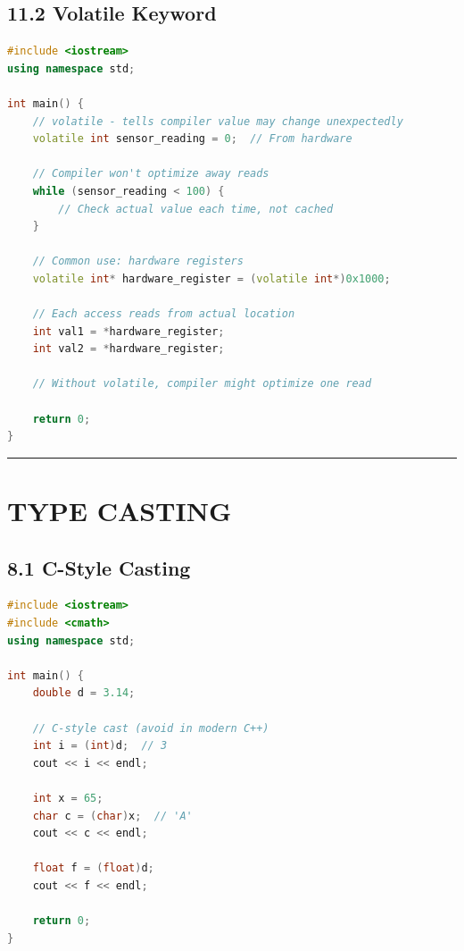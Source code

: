 \hypertarget{volatile-keyword}{%
\section{11.2 Volatile Keyword}\label{volatile-keyword}}

\begin{lstlisting}[language={C++}]
#include <iostream>
using namespace std;

int main() {
    // volatile - tells compiler value may change unexpectedly
    volatile int sensor_reading = 0;  // From hardware
    
    // Compiler won't optimize away reads
    while (sensor_reading < 100) {
        // Check actual value each time, not cached
    }
    
    // Common use: hardware registers
    volatile int* hardware_register = (volatile int*)0x1000;
    
    // Each access reads from actual location
    int val1 = *hardware_register;
    int val2 = *hardware_register;
    
    // Without volatile, compiler might optimize one read
    
    return 0;
}
\end{lstlisting}

\begin{center}\rule{0.5\linewidth}{0.5pt}\end{center}

\hypertarget{type-casting}{%
\chapter{TYPE CASTING}\label{type-casting}}

\hypertarget{c-style-casting}{%
\section{8.1 C-Style Casting}\label{c-style-casting}}

\begin{lstlisting}[language={C++}]
#include <iostream>
#include <cmath>
using namespace std;

int main() {
    double d = 3.14;
    
    // C-style cast (avoid in modern C++)
    int i = (int)d;  // 3
    cout << i << endl;
    
    int x = 65;
    char c = (char)x;  // 'A'
    cout << c << endl;
    
    float f = (float)d;
    cout << f << endl;
    
    return 0;
}
\end{lstlisting}

